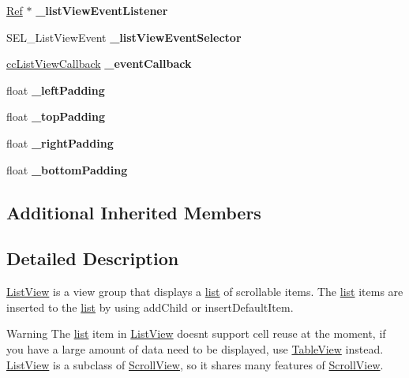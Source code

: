 \begin{DoxyCompactItemize}
\mbox{\label{classui_1_1ListView_a460e5d0ecb50b80024fd686ecadfe16b}} 
\hyperlink{classRef}{Ref} $\ast$ {\bfseries \+\_\+list\+View\+Event\+Listener}
\item 
\mbox{\label{classui_1_1ListView_a396b0d0f44bd03587576d9bd342efc6f}} 
S\+E\+L\+\_\+\+List\+View\+Event {\bfseries \+\_\+list\+View\+Event\+Selector}
\item 
\mbox{\label{classui_1_1ListView_ab6a6432f9b507f90428d236e447ff1c9}} 
\hyperlink{classui_1_1ListView_ac67b2dd17d792bb61a9020b3935ffc79}{cc\+List\+View\+Callback} {\bfseries \+\_\+event\+Callback}
\item 
\mbox{\label{classui_1_1ListView_a7e4e7b1e1007abeb5439803a217f6969}} 
float {\bfseries \+\_\+left\+Padding}
\item 
\mbox{\label{classui_1_1ListView_aa152ae62d221a3b0dc3f981ad6c5bcbe}} 
float {\bfseries \+\_\+top\+Padding}
\item 
\mbox{\label{classui_1_1ListView_af1d23e2ba6e1ab8d4f4898c6d0cdaccb}} 
float {\bfseries \+\_\+right\+Padding}
\item 
\mbox{\label{classui_1_1ListView_aa44312d5a4f7c793f925169bbecc4ac8}} 
float {\bfseries \+\_\+bottom\+Padding}
\end{DoxyCompactItemize}
\subsection*{Additional Inherited Members}


\subsection{Detailed Description}
\hyperlink{classui_1_1ListView}{List\+View} is a view group that displays a \hyperlink{protocollist-p}{list} of scrollable items. The \hyperlink{protocollist-p}{list} items are inserted to the \hyperlink{protocollist-p}{list} by using {\ttfamily add\+Child} or {\ttfamily insert\+Default\+Item}. 

\begin{DoxyWarning}{Warning}
The \hyperlink{protocollist-p}{list} item in \hyperlink{classui_1_1ListView}{List\+View} doesn\textquotesingle{}t support cell reuse at the moment, if you have a large amount of data need to be displayed, use {\ttfamily \hyperlink{classTableView}{Table\+View}} instead. \hyperlink{classui_1_1ListView}{List\+View} is a subclass of {\ttfamily \hyperlink{classui_1_1ScrollView}{Scroll\+View}}, so it shares many features of \hyperlink{classui_1_1ScrollView}{Scroll\+View}. 
\end{DoxyWarning}


